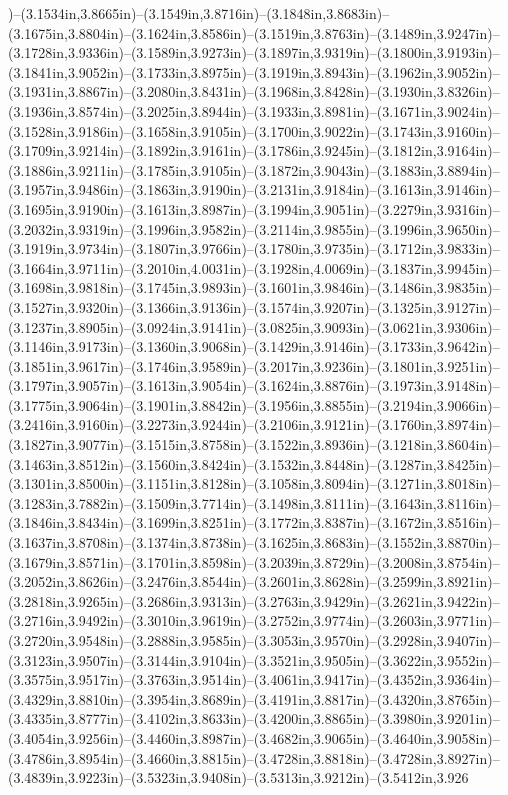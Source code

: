 )--(3.1534in,3.8665in)--(3.1549in,3.8716in)--(3.1848in,3.8683in)--(3.1675in,3.8804in)--(3.1624in,3.8586in)--(3.1519in,3.8763in)--(3.1489in,3.9247in)--(3.1728in,3.9336in)--(3.1589in,3.9273in)--(3.1897in,3.9319in)--(3.1800in,3.9193in)--(3.1841in,3.9052in)--(3.1733in,3.8975in)--(3.1919in,3.8943in)--(3.1962in,3.9052in)--(3.1931in,3.8867in)--(3.2080in,3.8431in)--(3.1968in,3.8428in)--(3.1930in,3.8326in)--(3.1936in,3.8574in)--(3.2025in,3.8944in)--(3.1933in,3.8981in)--(3.1671in,3.9024in)--(3.1528in,3.9186in)--(3.1658in,3.9105in)--(3.1700in,3.9022in)--(3.1743in,3.9160in)--(3.1709in,3.9214in)--(3.1892in,3.9161in)--(3.1786in,3.9245in)--(3.1812in,3.9164in)--(3.1886in,3.9211in)--(3.1785in,3.9105in)--(3.1872in,3.9043in)--(3.1883in,3.8894in)--(3.1957in,3.9486in)--(3.1863in,3.9190in)--(3.2131in,3.9184in)--(3.1613in,3.9146in)--(3.1695in,3.9190in)--(3.1613in,3.8987in)--(3.1994in,3.9051in)--(3.2279in,3.9316in)--(3.2032in,3.9319in)--(3.1996in,3.9582in)--(3.2114in,3.9855in)--(3.1996in,3.9650in)--(3.1919in,3.9734in)--(3.1807in,3.9766in)--(3.1780in,3.9735in)--(3.1712in,3.9833in)--(3.1664in,3.9711in)--(3.2010in,4.0031in)--(3.1928in,4.0069in)--(3.1837in,3.9945in)--(3.1698in,3.9818in)--(3.1745in,3.9893in)--(3.1601in,3.9846in)--(3.1486in,3.9835in)--(3.1527in,3.9320in)--(3.1366in,3.9136in)--(3.1574in,3.9207in)--(3.1325in,3.9127in)--(3.1237in,3.8905in)--(3.0924in,3.9141in)--(3.0825in,3.9093in)--(3.0621in,3.9306in)--(3.1146in,3.9173in)--(3.1360in,3.9068in)--(3.1429in,3.9146in)--(3.1733in,3.9642in)--(3.1851in,3.9617in)--(3.1746in,3.9589in)--(3.2017in,3.9236in)--(3.1801in,3.9251in)--(3.1797in,3.9057in)--(3.1613in,3.9054in)--(3.1624in,3.8876in)--(3.1973in,3.9148in)--(3.1775in,3.9064in)--(3.1901in,3.8842in)--(3.1956in,3.8855in)--(3.2194in,3.9066in)--(3.2416in,3.9160in)--(3.2273in,3.9244in)--(3.2106in,3.9121in)--(3.1760in,3.8974in)--(3.1827in,3.9077in)--(3.1515in,3.8758in)--(3.1522in,3.8936in)--(3.1218in,3.8604in)--(3.1463in,3.8512in)--(3.1560in,3.8424in)--(3.1532in,3.8448in)--(3.1287in,3.8425in)--(3.1301in,3.8500in)--(3.1151in,3.8128in)--(3.1058in,3.8094in)--(3.1271in,3.8018in)--(3.1283in,3.7882in)--(3.1509in,3.7714in)--(3.1498in,3.8111in)--(3.1643in,3.8116in)--(3.1846in,3.8434in)--(3.1699in,3.8251in)--(3.1772in,3.8387in)--(3.1672in,3.8516in)--(3.1637in,3.8708in)--(3.1374in,3.8738in)--(3.1625in,3.8683in)--(3.1552in,3.8870in)--(3.1679in,3.8571in)--(3.1701in,3.8598in)--(3.2039in,3.8729in)--(3.2008in,3.8754in)--(3.2052in,3.8626in)--(3.2476in,3.8544in)--(3.2601in,3.8628in)--(3.2599in,3.8921in)--(3.2818in,3.9265in)--(3.2686in,3.9313in)--(3.2763in,3.9429in)--(3.2621in,3.9422in)--(3.2716in,3.9492in)--(3.3010in,3.9619in)--(3.2752in,3.9774in)--(3.2603in,3.9771in)--(3.2720in,3.9548in)--(3.2888in,3.9585in)--(3.3053in,3.9570in)--(3.2928in,3.9407in)--(3.3123in,3.9507in)--(3.3144in,3.9104in)--(3.3521in,3.9505in)--(3.3622in,3.9552in)--(3.3575in,3.9517in)--(3.3763in,3.9514in)--(3.4061in,3.9417in)--(3.4352in,3.9364in)--(3.4329in,3.8810in)--(3.3954in,3.8689in)--(3.4191in,3.8817in)--(3.4320in,3.8765in)--(3.4335in,3.8777in)--(3.4102in,3.8633in)--(3.4200in,3.8865in)--(3.3980in,3.9201in)--(3.4054in,3.9256in)--(3.4460in,3.8987in)--(3.4682in,3.9065in)--(3.4640in,3.9058in)--(3.4786in,3.8954in)--(3.4660in,3.8815in)--(3.4728in,3.8818in)--(3.4728in,3.8927in)--(3.4839in,3.9223in)--(3.5323in,3.9408in)--(3.5313in,3.9212in)--(3.5412in,3.926